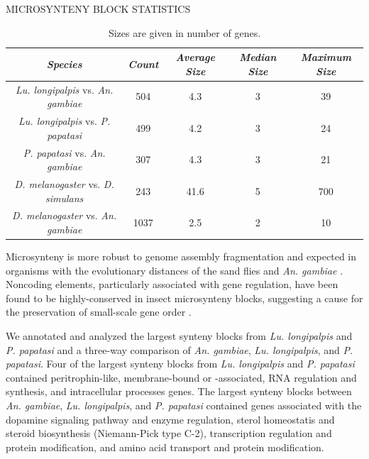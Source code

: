 \begin{table}[H]
  \centering
  \caption{MICROSYNTENY BLOCK STATISTICS}
  \begin{tabular}{c c c c c} \hline
    \emph{Species} & \emph{Count} & \emph{Average Size} & \emph{Median Size} & \emph{Maximum Size} \\ \hline
    \emph{Lu. longipalpis} vs. \emph{An. gambiae} & 504 & 4.3 & 3 & 39 \\
    \emph{Lu. longipalpis} vs. \emph{P. papatasi} & 499 & 4.2 & 3 & 24 \\
    \emph{P. papatasi} vs. \emph{An. gambiae} & 307 & 4.3 & 3 & 21 \\
    \emph{D. melanogaster} vs. \emph{D. simulans} & 243 & 41.6 & 5 & 700 \\
    \emph{D. melanogaster} vs. \emph{An. gambiae} & 1037 & 2.5 & 2 & 10
  \end{tabular}
  \caption*{Sizes are given in number of genes.}
  \label{tab:synteny-block-stats}
\end{table}

Microsynteny is more robust to genome assembly fragmentation and expected in organisms with the evolutionary distances of the sand flies and \emph{An. gambiae} \cite{Zdobnov2002}. Noncoding elements, particularly associated with gene regulation, have been found to be highly-conserved in insect microsynteny blocks, suggesting a cause for the preservation of small-scale gene order \cite{Engstrom2007}.

We annotated and analyzed the largest synteny blocks from \emph{Lu. longipalpis} and \emph{P. papatasi} and a three-way comparison of \emph{An. gambiae}, \emph{Lu. longipalpis}, and \emph{P. papatasi}.  Four of the largest synteny blocks from \emph{Lu. longipalpis} and \emph{P. papatasi} contained peritrophin-like, membrane-bound or -associated, RNA regulation and synthesis, and intracellular processes genes. The largest synteny blocks between \emph{An. gambiae}, \emph{Lu. longipalpis}, and \emph{P. papatasi} contained genes associated with the dopamine signaling pathway and enzyme regulation, sterol homeostatis and steroid biosynthesis (Niemann-Pick type C-2), transcription regulation and protein modification, and amino acid transport and protein modification.


